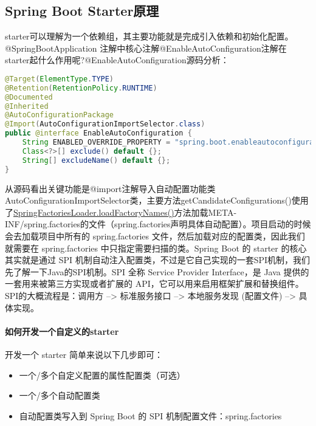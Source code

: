 \documentclass[../../../interview-questions.tex]{subfiles}
\begin{document}
\subsection{Spring Boot Starter原理}

starter可以理解为一个依赖组，其主要功能就是完成引入依赖和初始化配置。@SpringBootApplication 注解中核心注解@EnableAutoConfiguration注解在starter起什么作用呢?@EnableAutoConfiguration源码分析：

\begin{lstlisting}[language=Java]
@Target(ElementType.TYPE)
@Retention(RetentionPolicy.RUNTIME)
@Documented
@Inherited
@AutoConfigurationPackage
@Import(AutoConfigurationImportSelector.class)
public @interface EnableAutoConfiguration {
    String ENABLED_OVERRIDE_PROPERTY = "spring.boot.enableautoconfiguration";
    Class<?>[] exclude() default {};
    String[] excludeName() default {};
}
\end{lstlisting}

从源码看出关键功能是@import注解导入自动配置功能类AutoConfigurationImportSelector类，主要方法getCandidateConfigurations()使用了\url{SpringFactoriesLoader.loadFactoryNames()}方法加载META-INF/spring.factories的文件（spring.factories声明具体自动配置）。项目启动的时候会去加载项目中所有的 spring.factories 文件，然后加载对应的配置类，因此我们就需要在 spring.factories 中只指定需要扫描的类。Spring Boot 的 starter 的核心其实就是通过 SPI 机制自动注入配置类，不过是它自己实现的一套SPI机制，我们先了解一下Java的SPI机制。SPI 全称 Service Provider Interface，是 Java 提供的一套用来被第三方实现或者扩展的 API，它可以用来启用框架扩展和替换组件。SPI的大概流程是：调用方 –> 标准服务接口 –> 本地服务发现 (配置文件) –> 具体实现。

\paragraph{如何开发一个自定义的starter}

开发一个 starter 简单来说以下几步即可：

\begin{itemize}
    \item {一个/多个自定义配置的属性配置类（可选）}
    \item {一个/多个自动配置类}
    \item {自动配置类写入到 Spring Boot 的 SPI 机制配置文件：spring.factories}
\end{itemize}
\end{document}
